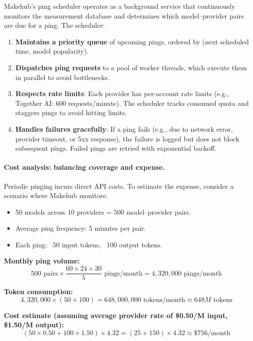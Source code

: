 \documentclass[english]{article}
\begin{document}
Makehub's ping scheduler operates as a background service that continuously monitors the measurement database and determines which model–provider pairs are due for a ping. The scheduler:
\begin{enumerate}
    \item \textbf{Maintains a priority queue} of upcoming pings, ordered by (next scheduled time, model popularity).
    \item \textbf{Dispatches ping requests} to a pool of worker threads, which execute them in parallel to avoid bottlenecks.
    \item \textbf{Respects rate limits}: Each provider has per-account rate limits (e.g., Together AI: 600 requests/minute). The scheduler tracks consumed quota and staggers pings to avoid hitting limits.
    \item \textbf{Handles failures gracefully}: If a ping fails (e.g., due to network error, provider timeout, or 5xx response), the failure is logged but does not block subsequent pings. Failed pings are retried with exponential backoff.
\end{enumerate}

\paragraph{Cost analysis: balancing coverage and expense.}

Periodic pinging incurs direct API costs. To estimate the expense, consider a scenario where Makehub monitors:
\begin{itemize}
    \item 50 models across 10 providers = 500 model–provider pairs.
    \item Average ping frequency: 5 minutes per pair.
    \item Each ping: ~50 input tokens, ~100 output tokens.
\end{itemize}

\textbf{Monthly ping volume:}
\[
500 \text{ pairs} \times \frac{60 \times 24 \times 30}{5} \text{ pings/month} = 4{,}320{,}000 \text{ pings/month}
\]

\textbf{Token consumption:}
\[
4{,}320{,}000 \times (50 + 100) = 648{,}000{,}000 \text{ tokens/month} \approx 648M \text{ tokens}
\]

\textbf{Cost estimate (assuming average provider rate of \$0.50/M input, \$1.50/M output):}
\[
(50 \times 0.50 + 100 \times 1.50) \times 4.32 = (25 + 150) \times 4.32 \approx \$756/\text{month}
\]
\end{document}
